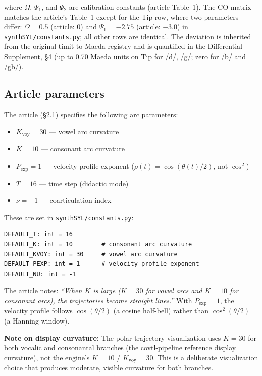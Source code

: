 \documentclass[11pt,a4paper]{article}
\begin{document}
where $\Omega$, $\Psi_1$, and $\Psi_2$ are calibration constants
(article Table~1). The CO matrix matches the article's Table~1 except
for the Tip row, where two parameters differ: $\Omega = 0.5$
(article: 0) and $\Psi_1 = -2.75$ (article: $-3.0$) in
\texttt{synthSYL/constants.py}; all other rows are identical. The
deviation is inherited from the original timit-to-Maeda registry and is
quantified in the Differential Supplement, \S4 (up to 0.70 Maeda units
on Tip for /d/, /g/; zero for /b/ and /gb/).

\subsection{Article parameters}

The article (\S2.1) specifies the following arc parameters:
\begin{itemize}
\item $K_{\text{voy}} = 30$ --- vowel arc curvature
\item $K = 10$ --- consonant arc curvature
\item $P_{\text{exp}} = 1$ --- velocity profile exponent
  ($\rho(t) = \cos(\theta(t)/2)$, not $\cos^2$)
\item $T = 16$ --- time step (didactic mode)
\item $\nu = -1$ --- coarticulation index
\end{itemize}

These are set in \texttt{synthSYL/constants.py}:
\begin{lstlisting}
DEFAULT_T: int = 16
DEFAULT_K: int = 10        # consonant arc curvature
DEFAULT_KVOY: int = 30     # vowel arc curvature
DEFAULT_PEXP: int = 1      # velocity profile exponent
DEFAULT_NU: int = -1
\end{lstlisting}

The article notes: \textit{``When $K$ is large ($K = 30$ for vowel
arcs and $K = 10$ for consonant arcs), the trajectories become
straight lines.''} With $P_{\text{exp}} = 1$, the velocity profile
follows $\cos(\theta/2)$ (a cosine half-bell) rather than
$\cos^2(\theta/2)$ (a Hanning window).

\textbf{Note on display curvature:} The polar trajectory
visualization uses $K = 30$ for both vocalic and consonantal branches
(the covtl-pipeline reference display curvature), not the engine's
$K = 10$ / $K_{\text{voy}} = 30$. This is a deliberate visualization
choice that produces moderate, visible curvature for both branches.

\end{document}
